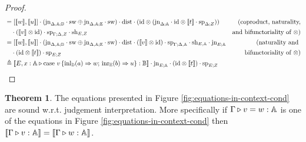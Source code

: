 \documentclass[10pt,a4paper]{amsart}
\theoremstyle{definition}
\theoremstyle{definition}
\theoremstyle{definition}
\theoremstyle{definition}
\theoremstyle{definition}
\theoremstyle{definition}
\newtheorem{theorem}[definition]{Theorem}
\begin{document}
\begin{proof}
\begin{align*}
  &= \left[[\![w ]\!] ,[\![ u]\!] \right] \comp  (\text{jn}_{ \Delta, \typeA;\typeD} \comp \sw \oplus \text{jn}_{ \Delta,\typeA;\typeE} \comp \sw)  \comp \dist \comp ( \text{id} \otimes (\text{jn}_{\Delta; \typeA} \cdot \text{id} \otimes [\![t]\!] \cdot \text{sp}_{\Delta; Z} ) )   & {(\text{coproduct, naturality,}}  \\
  & \hspace{10pt} \comp ([\![v]\!] \otimes \text{id}) \comp \text{sp}_{\Gamma; \Delta, Z} \comp \text{sh}_{E,Z}  & {\text{and bifunctoriality of } \otimes})  \\
  & =  [[\![w]\!], [\![u]\!]] \comp (\text{jn}_{ \Delta, \typeA;\typeD} \comp \sw \oplus \text{jn}_{ \Delta,\typeA;\typeE} \comp \sw)  \comp \dist   \comp ([\![v  ]\!] \otimes \text{id}) \comp \text{sp}_{\Gamma; \Delta, \typeA} \comp \text{sh}_{E,\typeA} \comp \text{jn}_{E; \typeA}  & {(\text{naturality and  }} \\
  & \hspace{10pt} \comp (\text{id} \otimes [\![ t  ]\!] ) \comp \text{sp}_{E;Z} &{\text{ bifunctoriality of } \otimes})  \\ 
  & \triangleq  [\![E,  x:\typeA \vljud \text{case } v\,  \{\text{inl}_{\typeD} (a) \Rightarrow w ;\, \text{inr}_{\typeE} (b) \Rightarrow u\}: \typeB]\!] \comp \text{jn}_{E; \typeA} \comp (\text{id} \otimes [\![ t ]\!] ) \comp \text{sp}_{E;Z}
\end{align*}
\end{proof}

\begin{theorem} \label {theorem:eq_in_context}
  The equations presented in Figure \ref{fig:equations-in-context-cond} are sound w.r.t. judgement interpretation. More specifically if $ \Gamma \triangleright v = w: \mathbb{A}$ is one of the equations in Figure \ref{fig:equations-in-context-cond} then $[\![ \Gamma \triangleright v: \mathbb{A} ]\!] = [\![ \Gamma \triangleright w: \mathbb{A} ]\!]$.
\end{theorem}

\end{document}
